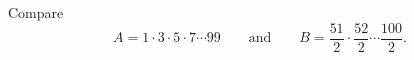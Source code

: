 Compare
\[
A=1\cdot3\cdot5\cdot7\cdots99\qquad\text{and}\qquad B=\dfrac{51}{2}\cdot\dfrac{52}{2}\cdots\dfrac{100}{2}.
\]
